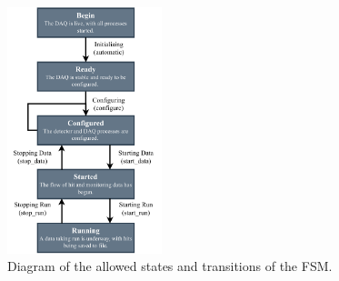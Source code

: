 \begin{figure} %
    \includegraphics[width=0.4\textwidth]{diagrams/5-daq/fsm.pdf}
    \caption[Diagram of the allowed states and transitions of the \chipsfive Finite State Machine]
    {Diagram of the allowed states and transitions of the \chipsfive FSM.}
    \label{fig:fsm}
\end{figure}

